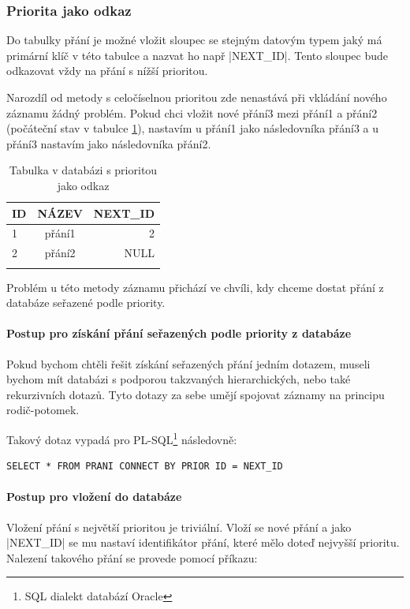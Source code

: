 \subsubsection{Priorita jako odkaz} 
Do tabulky přání je možné vložit sloupec se stejným datovým typem jaký má primární klíč v této tabulce a nazvat ho např |NEXT_ID|. Tento sloupec bude odkazovat vždy na přání s nížší prioritou.

Narozdíl od metody s celočíselnou prioritou zde nenastává při vkládání nového záznamu žádný problém. Pokud chci vložit nové přání3 mezi přání1 a přání2 (počáteční stav v tabulce \ref{tab:pointer-priority}), nastavím u přání1 jako následovníka přání3 a u přání3 nastavím jako následovníka přání2.

\begin{table}[htb]
	\begin{center}
	  \begin{tabular}{ | l | c | r | }
	    \hline
	    ID & NÁZEV & NEXT\_ID  \\ \hline \hline
	    1 & přání1 & 2  \\ \hline
	    2 & přání2 & NULL \\ \hline
	     & &  \\ \hline
	  \end{tabular}
	  \caption{Tabulka v databázi s prioritou jako odkaz}
	  \label{tab:pointer-priority}
	\end{center}
\end{table}

Problém u této metody záznamu přichází ve chvíli, kdy chceme dostat přání z databáze seřazené podle priority.

\paragraph{Postup pro získání přání seřazených podle priority z databáze}
Pokud bychom chtěli řešit získání seřazených přání jedním dotazem, museli bychom mít databázi s podporou takzvaných hierarchických, nebo také rekurzivních dotazů. Tyto dotazy za sebe umějí spojovat záznamy na principu rodič-potomek\cite{website:wiki:hierarchical-queries}.

Takový dotaz vypadá pro PL-SQL\footnote{SQL dialekt databází Oracle} následovně\cite{website:oracle:hierarchical}:
\begin{lstlisting}
SELECT * FROM PRANI CONNECT BY PRIOR ID = NEXT_ID
\end{lstlisting}

\paragraph{Postup pro vložení do databáze}
Vložení přání s největší prioritou je triviální. Vloží se nové přání a jako |NEXT_ID| se mu nastaví identifikátor přání, které mělo doteď nejvyšší prioritu. Nalezení takového přání se provede pomocí příkazu:

